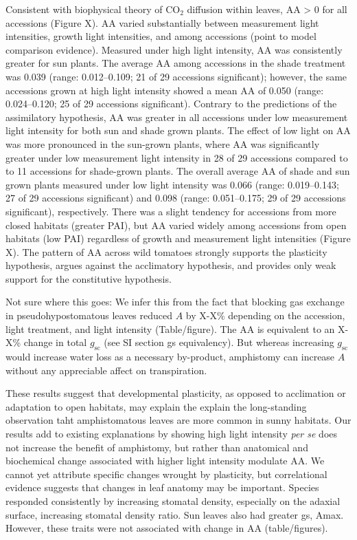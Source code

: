 \documentclass[
  letterpaper,
  DIV=11,
  numbers=noendperiod]{scrartcl}
\begin{document}
Consistent with biophysical theory of CO\(_2\) diffusion within leaves,
AA \textgreater{} 0 for all accessions (Figure X). AA varied
substantially between measurement light intensities, growth light
intensities, and among accessions (point to model comparison evidence).
Measured under high light intensity, AA was consistently greater for sun
plants. The average AA among accessions in the shade treatment was 0.039
(range: 0.012--0.109; 21 of 29 accessions significant); however, the
same accessions grown at high light intensity showed a mean AA of 0.050
(range: 0.024--0.120; 25 of 29 accessions significant). Contrary to the
predictions of the assimilatory hypothesis, AA was greater in all
accessions under low measurement light intensity for both sun and shade
grown plants. The effect of low light on AA was more pronounced in the
sun-grown plants, where AA was significantly greater under low
measurement light intensity in 28 of 29 accessions compared to to 11
accessions for shade-grown plants. The overall average AA of shade and
sun grown plants measured under low light intensity was 0.066 (range:
0.019--0.143; 27 of 29 accessions significant) and 0.098 (range:
0.051--0.175; 29 of 29 accessions significant), respectively. There was
a slight tendency for accessions from more closed habitats (greater
PAI), but AA varied widely among accessions from open habitats (low PAI)
regardless of growth and measurement light intensities (Figure X). The
pattern of AA across wild tomatoes strongly supports the plasticity
hypothesis, argues against the acclimatory hypothesis, and provides only
weak support for the constitutive hypothesis.

Not sure where this goes: We infer this from the fact that blocking gas
exchange in pseudohypostomatous leaves reduced \(A\) by X-X\% depending
on the accession, light treatment, and light intensity (Table/figure).
The AA is equivalent to an X-X\% change in total \(g_\text{sc}\) (see SI
section gs equivalency). But whereas increasing \(g_\text{sc}\) would
increase water loss as a necessary by-product, amphistomy can increase
\(A\) without any appreciable affect on transpiration.

These results suggest that developmental plasticity, as opposed to
acclimation or adaptation to open habitats, may explain the explain the
long-standing observation taht amphistomatous leaves are more common in
sunny habitats. Our results add to existing explanations by showing high
light intensity \emph{per se} does not increase the benefit of
amphistomy, but rather than anatomical and biochemical change associated
with higher light intensity modulate AA. We cannot yet attribute
specific changes wrought by plasticity, but correlational evidence
suggests that changes in leaf anatomy may be important. Species
responded consistently by increasing stomatal density, especially on the
adaxial surface, increasing stomatal density ratio. Sun leaves also had
greater gs, Amax. However, these traits were not associated with change
in AA (table/figures).
\end{document}
